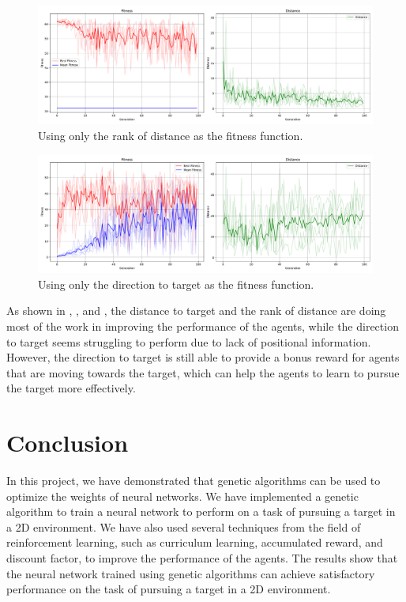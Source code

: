 \documentclass[sigconf]{acmart}
\begin{document}
\begin{figure}[H]
  \centering
  \includegraphics[width=0.95\linewidth]{imgs/result_Run_cx0.85_mut0.25_2024_1214_0634_rank_only.pdf}
  \caption{Using only the rank of distance as the fitness function.}
  \label{fig:plot_rank}
\end{figure}

\begin{figure}[H]
  \centering
  \includegraphics[width=0.95\linewidth]{imgs/result_Run_cx0.85_mut0.25_2024_1214_0636_dir_only.pdf}
  \caption{Using only the direction to target as the fitness function.}
  \label{fig:plot_dir}
\end{figure}
As shown in , , and , the distance to target and the rank of distance are doing most of the work in improving the performance of the agents, while the direction to target seems struggling to perform due to lack of positional information. However, the direction to target is still able to provide a bonus reward for agents that are moving towards the target, which can help the agents to learn to pursue the target more effectively.

\section{Conclusion}
In this project, we have demonstrated that genetic algorithms can be used to optimize the weights of neural networks. We have implemented a genetic algorithm to train a neural network to perform on a task of pursuing a target in a 2D environment. We have also used several techniques from the field of reinforcement learning, such as curriculum learning, accumulated reward, and discount factor, to improve the performance of the agents. The results show that the neural network trained using genetic algorithms can achieve satisfactory performance on the task of pursuing a target in a 2D environment.



\end{document}
